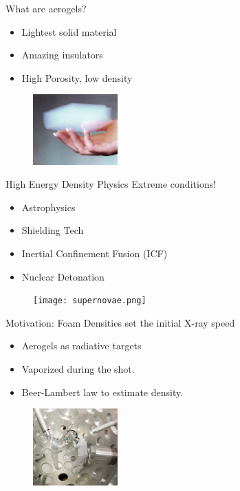 \documentclass[aspectratio=169,xcolor=dvipsnames]{beamer}
\begin{document}
\begin{frame}[plain]
  \titlepage
\end{frame}

\begin{frame}{What are aerogels?}
\begin{itemize}
  \item Lightest solid material
  \item Amazing insulators
  \item High Porosity, low density
\end{itemize}
 \begin{figure}[h!]
    \centering
    \includegraphics[width=0.29\textwidth]{aerogel.png}
  \end{figure}
\end{frame}

\begin{frame}{High Energy Density Physics}
Extreme conditions!
\begin{itemize}
  \item Astrophysics
  \item Shielding Tech
  \item Inertial Confinement Fusion (ICF)
  \item Nuclear Detonation
\end{itemize}
 \begin{figure}[h!]
    \centering
    \texttt{[image: supernovae.png]}
  \end{figure}
\end{frame}


\begin{frame}{Motivation: Foam Densities set the initial X-ray speed}
\begin{itemize}
  \item Aerogels as radiative targets
  \item Vaporized during the shot.
  \item Beer-Lambert law to estimate density.
\end{itemize}
 \begin{figure}[h!]
    \centering
    \includegraphics[width=0.29\textwidth]{omega.png}
  \end{figure}
\end{frame}
\end{document}
